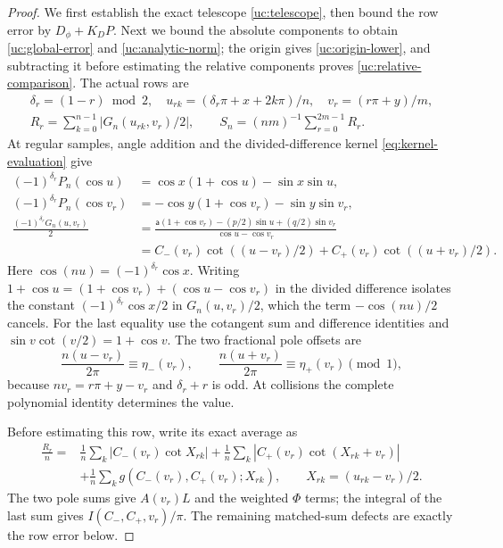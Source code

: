 \begin{proof}
We first establish the exact telescope \eqref{uc:telescope}, then bound
the row error by $D_\phi+K_DP$. Next we bound the absolute components
to obtain \eqref{uc:global-error} and \eqref{uc:analytic-norm}; the
origin gives \eqref{uc:origin-lower}, and subtracting it before estimating
the relative components proves \eqref{uc:relative-comparison}. The actual rows are
\[
 \begin{gathered}
 \delta_r=(1-r)\bmod2,\quad
 u_{rk}=(\delta_r\pi+x+2k\pi)/n,\quad v_r=(r\pi+y)/m,\\
 R_r=\sum_{k=0}^{n-1}|G_n(u_{rk},v_r)/2|,
 \qquad S_n=(nm)^{-1}\sum_{r=0}^{2m-1}R_r.
 \end{gathered}
\]
At regular samples, angle addition and the divided-difference kernel
\eqref{eq:kernel-evaluation} give
\[
 \begin{aligned}
 (-1)^{\delta_r}P_n(\cos u)&=\cos x(1+\cos u)-\sin x\sin u,\\
 (-1)^{\delta_r}P_n(\cos v_r)&=-\cos y(1+\cos v_r)-\sin y\sin v_r,\\
 \frac{(-1)^{\delta_r}G_n(u,v_r)}2
 &=\frac{\mathsf a(1+\cos v_r)-(p/2)\sin u+(q/2)\sin v_r}
          {\cos u-\cos v_r}\\
 &=C_-(v_r)\cot((u-v_r)/2)+C_+(v_r)\cot((u+v_r)/2).
 \end{aligned}
\]
Here $\cos(nu)=(-1)^{\delta_r}\cos x$.
Writing $1+\cos u=(1+\cos v_r)+(\cos u-\cos v_r)$ in the divided
difference isolates the constant $(-1)^{\delta_r}\cos x/2$ in
$G_n(u,v_r)/2$, which the term $-\cos(nu)/2$ cancels.
For the last equality use the cotangent sum and difference identities
and $\sin v\cot(v/2)=1+\cos v$. The two fractional pole offsets are
\[
 \frac{n(u-v_r)}{2\pi}\equiv\eta_-(v_r),\qquad
 \frac{n(u+v_r)}{2\pi}\equiv\eta_+(v_r)\pmod1,
\]
because $nv_r=r\pi+y-v_r$ and $\delta_r+r$ is odd.
At collisions the complete polynomial identity determines the value.

Before estimating this row, write its exact average as
\[
\begin{aligned}
\frac{R_r}{n}={}&\frac1n\sum_k|C_-(v_r)\cot X_{rk}|
+\frac1n\sum_k|C_+(v_r)\cot(X_{rk}+v_r)|\\
&+\frac1n\sum_kg(C_-(v_r),C_+(v_r);X_{rk}),
\qquad X_{rk}=(u_{rk}-v_r)/2.
\end{aligned}
\]
The two pole sums give $A(v_r)L$ and the weighted $\Phi$ terms;
the integral of the last sum gives $I(C_-,C_+,v_r)/\pi$.
The remaining matched-sum defects are exactly the row error below.


\end{proof}
